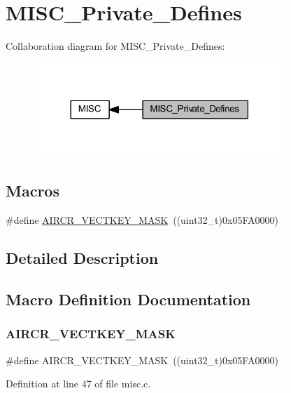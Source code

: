 \hypertarget{group___m_i_s_c___private___defines}{}\section{M\+I\+S\+C\+\_\+\+Private\+\_\+\+Defines}
\label{group___m_i_s_c___private___defines}
Collaboration diagram for M\+I\+S\+C\+\_\+\+Private\+\_\+\+Defines\+:
\nopagebreak
\begin{figure}[H]
\begin{center}
\leavevmode
\includegraphics[width=270pt]{group___m_i_s_c___private___defines}
\end{center}
\end{figure}
\subsection*{Macros}
\begin{DoxyCompactItemize}
\item 
\#define \hyperlink{group___m_i_s_c___private___defines_gad6905141fba3a2d8d5570db40805dc6a}{A\+I\+R\+C\+R\+\_\+\+V\+E\+C\+T\+K\+E\+Y\+\_\+\+M\+A\+SK}~((uint32\+\_\+t)0x05\+F\+A0000)
\end{DoxyCompactItemize}


\subsection{Detailed Description}


\subsection{Macro Definition Documentation}
\mbox{\label{group___m_i_s_c___private___defines_gad6905141fba3a2d8d5570db40805dc6a}} 
\subsubsection{\texorpdfstring{A\+I\+R\+C\+R\+\_\+\+V\+E\+C\+T\+K\+E\+Y\+\_\+\+M\+A\+SK}{AIRCR\_VECTKEY\_MASK}}
{\footnotesize\ttfamily \#define A\+I\+R\+C\+R\+\_\+\+V\+E\+C\+T\+K\+E\+Y\+\_\+\+M\+A\+SK~((uint32\+\_\+t)0x05\+F\+A0000)}



Definition at line 47 of file misc.\+c.

